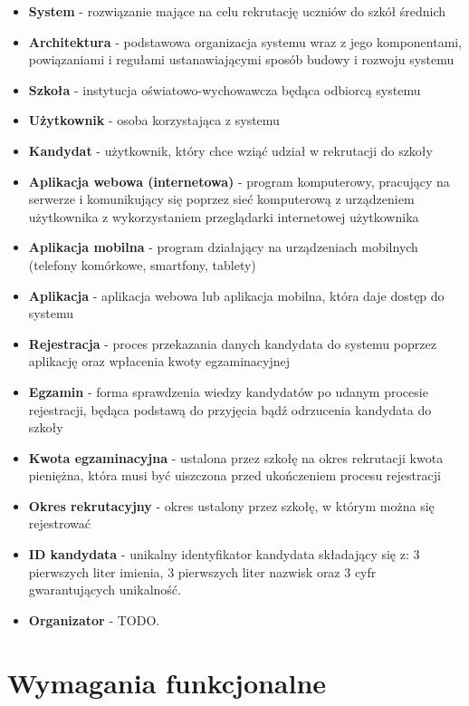 \documentclass{article}
\begin{document}
\begin{itemize}
	\item \textbf{System} - rozwiązanie mające na celu rekrutację uczniów do szkół średnich
	\item \textbf{Architektura} - podstawowa organizacja systemu wraz z jego komponentami, powiązaniami i regułami ustanawiającymi sposób budowy i rozwoju systemu
	\item \textbf{Szkoła} - instytucja oświatowo-wychowawcza będąca odbiorcą systemu
	\item \textbf{Użytkownik} - osoba korzystająca z systemu
	\item \textbf{Kandydat} - użytkownik, który chce wziąć udział w rekrutacji do szkoły
	\item \textbf{Aplikacja webowa (internetowa)} - program komputerowy, pracujący na serwerze i komunikujący się poprzez sieć komputerową z urządzeniem użytkownika z wykorzystaniem przeglądarki internetowej użytkownika
	\item \textbf{Aplikacja mobilna} - program działający na urządzeniach mobilnych (telefony komórkowe, smartfony, tablety)
	\item \textbf{Aplikacja} - aplikacja webowa lub aplikacja mobilna, która daje dostęp do systemu
	\item \textbf{Rejestracja} - proces przekazania danych kandydata do systemu poprzez aplikację oraz wpłacenia kwoty egzaminacyjnej
	\item \textbf{Egzamin} - forma sprawdzenia wiedzy kandydatów po udanym procesie rejestracji, będąca podstawą do przyjęcia bądź odrzucenia kandydata do szkoły
	\item \textbf{Kwota egzaminacyjna} - ustalona przez szkołę na okres rekrutacji kwota pieniężna, która musi być uiszczona przed ukończeniem procesu rejestracji
	\item \textbf{Okres rekrutacyjny} - okres ustalony przez szkołę, w którym można się rejestrować
	\item \textbf{ID kandydata} - unikalny identyfikator kandydata składający się z: 3 pierwszych liter imienia, 3 pierwszych liter nazwisk oraz 3 cyfr gwarantujących unikalność.
	\item \textbf{Organizator} - TODO.
\end{itemize}

\section{Wymagania funkcjonalne}
\end{document}
